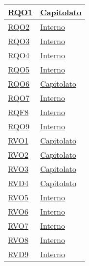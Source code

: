 \begin{longtable}{|>{\centering}m{5cm}|m{5cm}<{\centering}|}
\hyperlink{RQO1}{RQO1} & \hyperlink{Capitolato}{Capitolato}\\ \hline

\hyperlink{RQO2}{RQO2} & \hyperlink{Interno}{Interno}\\ \hline

\hyperlink{RQO3}{RQO3} & \hyperlink{Interno}{Interno}\\ \hline

\hyperlink{RQO4}{RQO4} & \hyperlink{Interno}{Interno}\\ \hline

\hyperlink{RQO5}{RQO5} & \hyperlink{Interno}{Interno}\\ \hline

\hyperlink{RQO6}{RQO6} & \hyperlink{Capitolato}{Capitolato}\\ \hline

\hyperlink{RQO7}{RQO7} & \hyperlink{Interno}{Interno}\\ \hline

\hyperlink{RQF8}{RQF8} & \hyperlink{Interno}{Interno}\\ \hline

\hyperlink{RQO9}{RQO9} & \hyperlink{Interno}{Interno}\\ \hline

\hyperlink{RVO1}{RVO1} & \hyperlink{Capitolato}{Capitolato}\\ \hline

\hyperlink{RVO2}{RVO2} & \hyperlink{Capitolato}{Capitolato}\\ \hline

\hyperlink{RVO3}{RVO3} & \hyperlink{Capitolato}{Capitolato}\\ \hline

\hyperlink{RVD4}{RVD4} & \hyperlink{Capitolato}{Capitolato}\\ \hline

\hyperlink{RVO5}{RVO5} & \hyperlink{Interno}{Interno}\\ \hline

\hyperlink{RVO6}{RVO6} & \hyperlink{Interno}{Interno}\\ \hline

\hyperlink{RVO7}{RVO7} & \hyperlink{Interno}{Interno}\\ \hline

\hyperlink{RVO8}{RVO8} & \hyperlink{Interno}{Interno}\\ \hline

\hyperlink{RVD9}{RVD9} & \hyperlink{Interno}{Interno}\\ \hline


\end{longtable}
